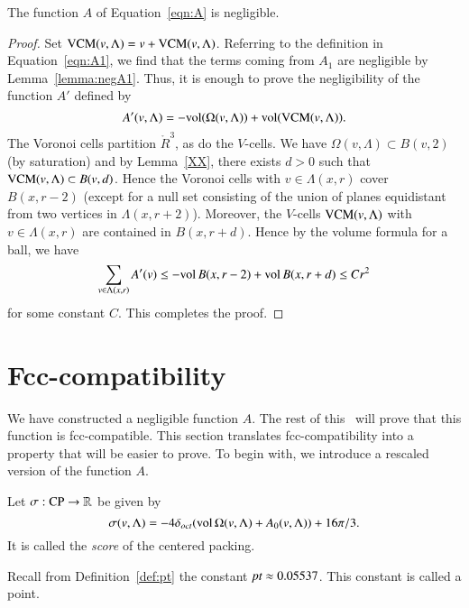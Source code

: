 \begin{theorem}\label{lemma:negligible}
The function $A$ of Equation~\ref{eqn:A} is negligible.
\end{theorem}

\begin{proof}   Set ${\operatorname{VCM}}(v,\Lambda) = v + {\operatorname{VCM}}(v,\Lambda)$.
Referring to the definition in Equation~\ref{eqn:A1}, we find that
the terms coming from $A_1$ are negligible by
Lemma~\ref{lemma:negA1}.  Thus, it is enough to prove the
negligibility of the function $A'$ defined by
      $$
      A'(v,\Lambda) = -{\operatorname{vol}}(\Omega(v,\Lambda))+
         {\operatorname{vol}}({\operatorname{VCM}}(v,\Lambda)).$$
The Voronoi cells partition $\ring{R}^3$, as do the $V$-cells. We
have $\Omega(v,\Lambda)\subset B(v,2)$ (by saturation) and by
Lemma~\ref{XX}, there exists $d>0$ such that
${\operatorname{VCM}}(v,\Lambda)\subset B(v,d)$. Hence the Voronoi cells with
$v\in \Lambda(x,r)$ cover $B(x,r-2)$ (except for a null set
consisting of the union of planes equidistant from two vertices in
$\Lambda(x,r+2)$). Moreover, the $V$-cells ${\operatorname{VCM}}(v,\Lambda)$
with $v\in \Lambda(x,r)$ are contained in $B(x,r+d)$.  Hence by
the volume formula for a ball, we have
   $$
   \sum_{v\in\Lambda(x,r)} A'(v) \le -{\operatorname{vol}}\,B(x,r-2)
      +{\operatorname{vol}}\,B(x,r+d)\le C r^2
   $$
for some constant $C$. This completes the proof.
\end{proof}


\section{Fcc-compatibility}

We have constructed a negligible function $A$.  The rest of this
\paper\ will prove that this function is fcc-compatible.   This
section translates fcc-compatibility into a property that will be
easier to prove.  To begin with, we introduce a rescaled version
of the function $A$.

\begin{definition}\label{def:score}
Let $\sigma:{\operatorname{CP}}\to\mathbb{R}$ be given by
   $$\sigma(v,\Lambda) = -4\delta_{oct} ({\operatorname{vol}}\,\Omega(v,\Lambda) + A_0(v,\Lambda)) +
   16\pi/3.$$
It is called the {\it score} of the centered packing.
%
\end{definition}

Recall from Definition~\ref{def:pt} the constant $\hbox{\it pt}\approx
0.05537$.  This constant is called a point.

